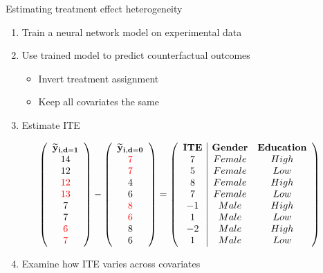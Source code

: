 \documentclass[
  ignorenonframetext,
]{beamer}
\providecommand{\tightlist}{%
  \setlength{\itemsep}{0pt}\setlength{\parskip}{0pt}}
\begin{document}
\begin{frame}{Estimating treatment effect heterogeneity}
\protect\hypertarget{estimating-treatment-effect-heterogeneity}{}
\begin{enumerate}
\item
  Train a neural network model on experimental data
\item
  Use trained model to predict counterfactual outcomes

  \begin{itemize}
  \tightlist
  \item
    Invert treatment assignment
  \item
    Keep all covariates the same
  \end{itemize}
\item
  Estimate ITE
\end{enumerate}

\begin{scriptsize}
\[ \left( \begin{array}{c}
\mathbf{\widetilde{y}_{i,d=1}} \\
14 \\
12 \\
\textcolor{red}{12} \\
\textcolor{red}{13} \\ 
7 \\
7 \\
\textcolor{red}{6} \\
\textcolor{red}{7} \\
\end{array} \right) -
%
\left( \begin{array}{c}
\mathbf{\widetilde{y}_{i,d=0}} \\
\textcolor{red}{7} \\
\textcolor{red}{7} \\
4 \\
6 \\ 
\textcolor{red}{8} \\
\textcolor{red}{6} \\
8 \\
6 \\
\end{array} \right) =
%
\left( \begin{array}{c|cc}
\textbf{\text{ITE}} & \textbf{Gender} & \textbf{Education} \\
7 & Female & High \\
5 & Female & Low \\
8 & Female & High \\
7 & Female & Low \\
-1 & Male & High \\
1 & Male & Low \\
-2 & Male & High \\
1 & Male & Low \\
\end{array} \right)
\]
\end{scriptsize}

\begin{enumerate}
\setcounter{enumi}{3}
\tightlist
\item
  Examine how ITE varies across covariates
\end{enumerate}
\end{frame}
\end{document}
